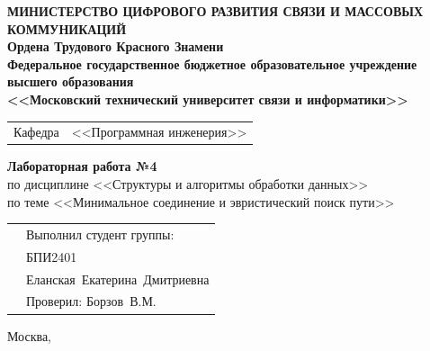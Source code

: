 \thispagestyle{empty}

\begin{center}
	\textbf{МИНИСТЕРСТВО ЦИФРОВОГО РАЗВИТИЯ СВЯЗИ И МАССОВЫХ КОММУНИКАЦИЙ} \\
	\textbf{Ордена Трудового Красного Знамени \\
		Федеральное государственное бюджетное образовательное учреждение высшего образования \\
		<<Московский технический университет связи и информатики>>}
\end{center}

\vspace{0.3em}

\begin{center}
	\begin{tabularx}{0.55\textwidth}{p{1.2cm}X}
		Кафедра & \quad <<Программная инженерия>> \\%
	\end{tabularx}
\end{center}

\vspace{12em}

\begin{center}
	\Large
	\textbf{Лабораторная работа №4} \\
	\large
	по дисциплине <<Структуры и алгоритмы обработки данных>> \\
	по теме <<Минимальное соединение и эвристический поиск пути>>
\end{center}

\vspace{3em}

\renewcommand{\arraystretch}{1.1}
\begin{tabularx}{\textwidth}{p{8cm}p{7cm}}
	& Выполнил студент группы: \\
	& БПИ2401 \\
	& Еланская~Екатерина~Дмитриевна\\
	& Проверил: Борзов~В.М.\\
\end{tabularx}

\vspace{8em}

\begin{center}
	Москва,~\the\year
\end{center}
\clearpage

